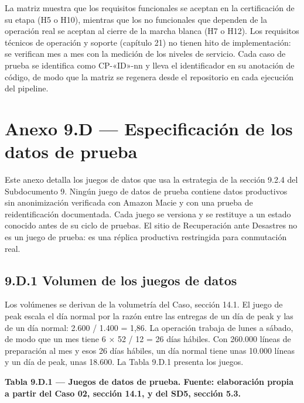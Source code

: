 La matriz muestra que los requisitos funcionales se aceptan en la certificación de su etapa (H5 o H10), mientras que los no funcionales que dependen de la operación real se aceptan al cierre de la marcha blanca (H7 o H12). Los requisitos técnicos de operación y soporte (capítulo 21) no tienen hito de implementación: se verifican mes a mes con la medición de los niveles de servicio. Cada caso de prueba se identifica como CP-«ID»-nn y lleva el identificador en su anotación de código, de modo que la matriz se regenera desde el repositorio en cada ejecución del pipeline.

\section*{Anexo 9.D — Especificación de los datos de prueba}

Este anexo detalla los juegos de datos que usa la estrategia de la sección 9.2.4 del Subdocumento 9. Ningún juego de datos de prueba contiene datos productivos sin anonimización verificada con Amazon Macie y con una prueba de reidentificación documentada. Cada juego se versiona y se restituye a un estado conocido antes de su ciclo de pruebas. El sitio de Recuperación ante Desastres no es un juego de prueba: es una réplica productiva restringida para conmutación real.

\subsection*{9.D.1 Volumen de los juegos de datos}

Los volúmenes se derivan de la volumetría del Caso, sección 14.1. El juego de peak escala el día normal por la razón entre las entregas de un día de peak y las de un día normal: 2.600 / 1.400 = 1,86. La operación trabaja de lunes a sábado, de modo que un mes tiene 6 × 52 / 12 = 26 días hábiles. Con 260.000 líneas de preparación al mes y esos 26 días hábiles, un día normal tiene unas 10.000 líneas y un día de peak, unas 18.600. La Tabla 9.D.1 presenta los juegos.

\textbf{Tabla 9.D.1 — Juegos de datos de prueba. Fuente: elaboración propia a partir del Caso 02, sección 14.1, y del SD5, sección 5.3.}

